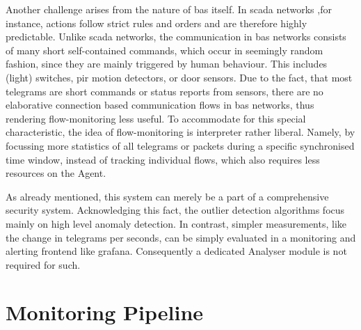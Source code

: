 Another challenge arises from the nature of \gls{bas} itself. In \gls{scada} networks ,for instance, actions follow strict rules and orders and are therefore highly predictable. %
Unlike \gls{scada} networks, the communication in \gls{bas} networks consists of many short self-contained commands, which occur in seemingly random fashion, since they are mainly triggered by human behaviour. This includes (light) switches, \gls{pir} motion detectors, or door sensors.
Due to the fact, that most telegrams are short commands or status reports from sensors, there are no elaborative connection based communication flows in \gls{bas} networks, thus rendering flow-monitoring less useful.
To accommodate for this special characteristic, the idea of flow-monitoring is interpreter rather liberal. 
Namely, by focussing more statistics of all telegrams or packets during a specific synchronised time window, instead of tracking individual flows, which also requires less resources on the Agent.

As already mentioned, this system can merely be a part of a comprehensive security system. Acknowledging this fact, the outlier detection algorithms focus mainly on high level anomaly detection. %
In contrast, simpler measurements, like the change in telegrams per seconds, can be simply evaluated in a monitoring and alerting frontend like \gls{grafana}. Consequently a dedicated Analyser module is not required for such.

\section{Monitoring Pipeline}
\label{sec:concept:pipeline}

